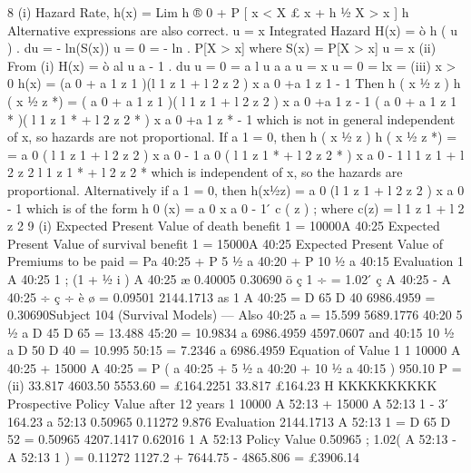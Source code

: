 8
(i)
Hazard Rate, h(x) = Lim
h ® 0 +
P [ x < X £ x + h 1⁄2 X > x ]
h
Alternative expressions are also correct.
u = x
Integrated Hazard H(x) =
ò
h ( u ) . du = - ln(S(x))
u = 0
= - ln . P[X > x]
where S(x) = P[X > x]
u = x
(ii)
From (i)
H(x) =
ò
al u a - 1 . du
u = 0
=
a
l u a
a
u = x
u = 0
= lx =
(iii)
x > 0
h(x) = (a 0 + a 1 z 1 )(l 1 z 1 + l 2 z 2 ) x a 0 +a 1 z 1 - 1
Then
h ( x 1⁄2 z )
h ( x 1⁄2 z *)
=
( a 0 + a 1 z 1 )( l 1 z 1 + l 2 z 2 ) x a 0 +a 1 z - 1
( a 0 + a 1 z 1 * )( l 1 z 1 * + l 2 z 2 * ) x a 0 +a 1 z * - 1
which is not in general independent of x, so hazards are
not proportional.
If a 1 = 0, then
h ( x 1⁄2 z )
h ( x 1⁄2 z *)
=
=
a 0 ( l 1 z 1 + l 2 z 2 ) x a 0 - 1
a 0 ( l 1 z 1 * + l 2 z 2 * ) x a 0 - 1
l 1 z 1 + l 2 z 2
l 1 z 1 * + l 2 z 2 *
which is independent of x, so the hazards are proportional.
Alternatively if a 1 = 0, then
h(x1⁄2z) = a 0 (l 1 z 1 + l 2 z 2 ) x a 0 - 1
which is of the form h 0 (x) = a 0 x a 0 - 1  ́ c ( z ) ; where c(z) = l 1 z 1 + l 2 z 2
9
(i)
Expected Present Value of death benefit 1
= 10000A 40:25
Expected Present Value of survival benefit 1
= 15000A 40:25
Expected Present Value of Premiums to be paid
= Pa 40:25 + P 5 1⁄2 a 40:20 + P 10 1⁄2 a 40:15
Evaluation
1
A 40:25
1
; (1 + 1⁄2 i ) A 40:25
æ 0.40005 0.30690 ö
ç
1 ÷
= 1.02  ́ ç A 40:25 - A 40:25
÷
ç
÷
è
ø
= 0.09501
2144.1713
as
1
A 40:25
=
D 65
D 40
6986.4959
= 0.30690Subject 104 (Survival Models) — %
Also
40:25
a
= 15.599
5689.1776
40:20
5 1⁄2 a
D 45
D 65
=
13.488
45:20 = 10.9834
a
6986.4959
4597.0607
and
40:15
10 1⁄2 a
D 50
D 40
=
10.995
50:15 = 7.2346
a
6986.4959
Equation of Value
1
1
10000 A 40:25
+ 15000 A 40:25
= P ( a 40:25 + 5 1⁄2 a 40:20 + 10 1⁄2 a 40:15 )
950.10
P =
(ii)
33.817
4603.50
5553.60
= £164.2251
33.817
£164.23 H
KKKKKKKKKK
Prospective Policy Value after 12 years
1
10000 A 52:13
+ 15000 A 52:13 1 - 3  ́ 164.23 a 52:13
0.50965
0.11272
9.876
Evaluation
2144.1713
A 52:13 1 =
D 65
D 52
= 0.50965
4207.1417
0.62016
1
A 52:13
Policy Value
0.50965
; 1.02( A 52:13 - A 52:13 1 ) = 0.11272
1127.2 + 7644.75 - 4865.806 = £3906.14
